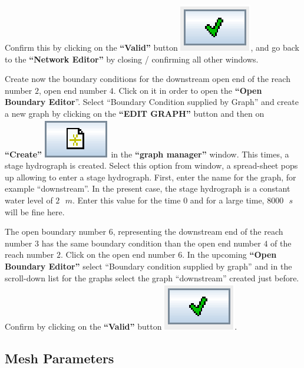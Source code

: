 \documentclass[a4paper,12pt]{article}
\begin{document}
Confirm this by clicking on the \textbf{{}``Valid'' }button \includegraphics[scale=0.6]{valid},
and go back to the \textbf{{}``Network Editor''} by closing / confirming
all other windows.

\vspace{0.5cm}

Create now the boundary conditions for the downstream open end of
the reach number $2$, open end number $4$. Click on it in order to open
the \textbf{{}``Open Boundary Editor}''. Select {}``Boundary Condition
supplied by Graph'' and create a new graph by clicking on the \textbf{{}``EDIT
GRAPH''} button and then on \textbf{{}``Create''} \includegraphics[scale=0.6]{new} in
the \textbf{{}``graph manager'' }window. This times, a stage hydrograph
is created. Select this option from window, a spread-sheet pops up
allowing to enter a stage hydrograph. First, enter the name for
the graph, for example {}``downstream''. In the present case, the
stage hydrograph is a constant water level of $2\mbox{ }m$. Enter this value
for the time $0$ and for a large time, $8000\mbox{ }s$ will be fine here.

\vspace{0.5cm}

The open boundary number $6$, representing the downstream end of the
reach number $3$ has the same boundary condition than the open end number
$4$ of the reach number $2$. Click on the open end number $6$. In the upcoming
\textbf{{}``Open Boundary Editor''} select {}``Boundary condition
supplied by graph'' and in the scroll-down list for the graphs select
the graph {}``downstream'' created just before. Confirm by clicking
on the \textbf{{}``Valid'' }button \includegraphics[scale=0.6]{valid}.


\subsection{Mesh Parameters }
\end{document}
